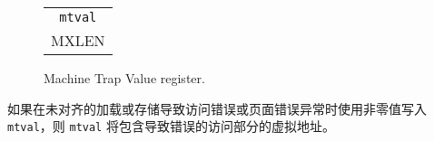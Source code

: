 \begin{figure}[h!]
{\footnotesize
\begin{center}
\begin{tabular}{@{}J}
 \\
\hline
{} \\
\hline
MXLEN \\
\end{tabular}
\end{center}
}
\vspace{-0.1in}
\caption{Machine Trap Value register.}
\label{mtvalreg}
\end{figure}

\iffalse
If {\tt mtval} is written with a nonzero value when a misaligned load or store
causes an access-fault or page-fault exception, then {\tt mtval} will contain
the virtual address of the portion of the access that caused the fault.

If {\tt mtval} is written with a nonzero value when an instruction
access-fault or page-fault exception occurs on a system with variable-length
instructions, then {\tt mtval} will contain the virtual address of the portion
of the instruction that caused the fault, while {\tt mepc} will point to the
beginning of the instruction.

The {\tt mtval} register can optionally also be used to return the faulting
instruction bits on an illegal instruction exception ({\tt mepc} points to the
faulting instruction in memory).
If {\tt mtval} is written with a nonzero value when an illegal-instruction
exception occurs, then {\tt mtval} will contain the shortest of:
\fi
如果在未对齐的加载或存储导致访问错误或页面错误异常时使用非零值写入 {\tt mtval}，则 {\tt mtval} 将包含导致错误的访问部分的虚拟地址。

